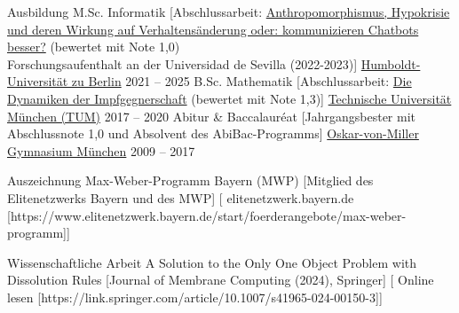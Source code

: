 \documentclass[
]{../llresume}
\begin{document}
\makeheader

\begin{mainpane}
    \begin{mainsection}{Ausbildung}
        \entryJob
            {M.Sc. Informatik}
            [Abschlussarbeit: \href{https://julienandco.github.io/masters_thesis/thesis.pdf}{Anthropomorphismus, Hypokrisie und deren Wirkung auf Verhaltensänderung oder: kommunizieren Chatbots besser?} (bewertet mit Note 1,0)\\Forschungsaufenthalt an der Universidad de Sevilla (2022-2023)]
            {\href{https://www.informatik.hu-berlin.de/de/studium/Master/Master}{Humboldt-Universität zu Berlin}}
            {2021 -- 2025}
        \entryJob
            {B.Sc. Mathematik}
            [Abschlussarbeit: \href{https://julienandco.github.io/the-dynamics-of-vaccine-hesitancy/bachelor_thesis_julien_caselmann.pdf}{Die Dynamiken der Impfgegnerschaft} (bewertet mit Note 1,3)]
            {\href{https://www.ma.tum.de/}{Technische Universität München (TUM)}}
            {2017 -- 2020}
        \entryJob
            {Abitur \& Baccalauréat}
            [Jahrgangsbester mit Abschlussnote 1,0 und Absolvent des AbiBac-Programms]
            {\href{https://www.ovmg.de/}{Oskar-von-Miller Gymnasium München}}
            {2009 -- 2017}
    \end{mainsection}
    
    \begin{mainsection}{Auszeichnung}
        \entryGeneric
            {Max-Weber-Programm Bayern (MWP)} 
            [Mitglied des Elitenetzwerks Bayern und des MWP]
            [\infoHomepage
                {elitenetzwerk.bayern.de}
                [https://www.elitenetzwerk.bayern.de/start/foerderangebote/max-weber-programm]]
    \end{mainsection}
    
    \begin{mainsection}{Wissenschaftliche Arbeit}
        \entryGeneric
            {A Solution to the Only One Object Problem with Dissolution Rules}
            [Journal of Membrane Computing (2024), Springer]
            [\infoHomepage
                {Online lesen}
                [https://link.springer.com/article/10.1007/s41965-024-00150-3]]
    \end{mainsection}
    

\end{mainpane}
\end{document}
